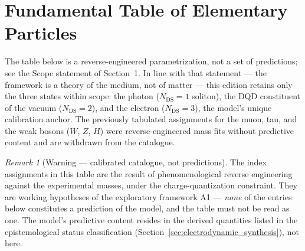 \documentclass[11pt,a4paper]{article}
\theoremstyle{plain}
\theoremstyle{remark}
\newtheorem*{remarkstar}{Remark}
\newcommand{\Ncd}{\ensuremath{N_{\mathrm{DS}}}}
\begin{document}
\section{Fundamental Table of Elementary Particles}
The table below is a reverse-engineered parametrization, not a set of predictions; see the Scope statement of Section~1. In line with that statement --- the framework is a theory of the medium, not of matter --- this edition retains only the three states within scope: the photon ($\Ncd=1$ soliton), the DQD constituent of the vacuum ($\Ncd=2$), and the electron ($\Ncd=3$), the model's unique calibration anchor. The previously tabulated assignments for the muon, tau, and the weak bosons ($W$, $Z$, $H$) were reverse-engineered mass fits without predictive content and are withdrawn from the catalogue.

\begin{remarkstar}[Warning --- calibrated catalogue, not predictions]
The index assignments in this table are the result of phenomenological reverse engineering against the experimental masses, under the charge-quantization constraint. They are working hypotheses of the exploratory framework A1 --- \emph{none} of the entries below constitutes a prediction of the model, and the table must not be read as one. The model's predictive content resides in the derived quantities listed in the epistemological status classification (Section~\ref{sec:electrodynamic_synthesis}), not here.
\end{remarkstar}
\end{document}
